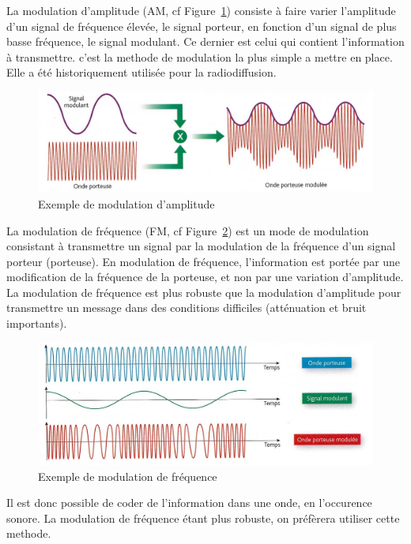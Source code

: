 \documentclass[12pt]{article}
\begin{document}
La modulation d'amplitude (AM, cf Figure~\ref{fig:modAmp}) consiste à faire varier l'amplitude d'un signal de fréquence élevée, le signal porteur, en fonction d'un signal de plus basse fréquence, le signal modulant. Ce dernier est celui qui contient l'information à transmettre. c'est la methode de modulation la plus simple a mettre en place. Elle a été historiquement utilisée pour la radiodiffusion.
\begin{figure}[H]
\begin{center}
\caption{Exemple de modulation d'amplitude}
\label{fig:modAmp}
\includegraphics[scale=0.30]{modAmp.jpg}
\end{center}
\end{figure}

La modulation de fréquence (FM, cf Figure~\ref{fig:modFreq}) est un mode de modulation consistant à transmettre un signal par la modulation de la fréquence d'un signal porteur (porteuse).
En modulation de fréquence, l'information est portée par une modification de la fréquence de la porteuse, et non par une variation d'amplitude. La modulation de fréquence est plus robuste que la modulation d'amplitude pour transmettre un message dans des conditions difficiles (atténuation et bruit importants).
\begin{figure}[H]
\begin{center}
\caption{Exemple de modulation de fréquence}
\label{fig:modFreq}
\includegraphics[scale=0.30]{Mod_Freq.jpg}
\end{center}
\end{figure}

Il est donc possible de coder de l'information dans une onde, en l'occurence sonore.
La modulation de fréquence étant plus robuste, on préfèrera utiliser cette methode.
\end{document}
